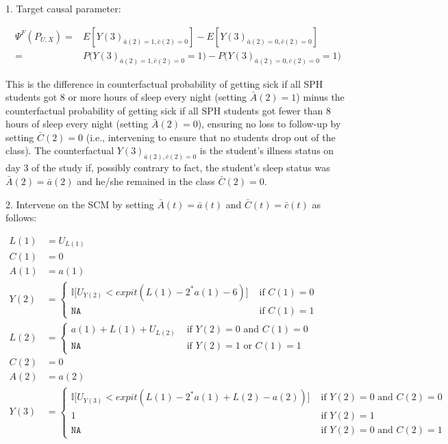 \documentclass[answers]{exam}
\begin{document}
\begin{solution}


1. Target causal parameter:

\begin{align*}
\Psi^F(P_{U,X}) = & E[Y(3)_{\bar{a}(2) = 1, \bar{c}(2) = 0}] - E[Y(3)_{\bar{a}(2) = 0, \bar{c}(2) = 0}] \\
= & P\big(Y(3)_{\bar{a}(2) = 1, \bar{c}(2) = 0} = 1\big) - P\big(Y(3)_{\bar{a}(2) = 0, \bar{c}(2) = 0} = 1\big)
\end{align*}


This is the difference in counterfactual probability of getting sick if all SPH students got 8 or more hours of sleep every night (setting $\bar{A}(2) = 1$) minus the counterfactual probability of getting sick if all SPH students got fewer than 8 hours of sleep every night (setting $\bar{A}(2) = 0$), ensuring no loss to follow-up by setting $\bar{C}(2) = 0$ (i.e., intervening to ensure that no students drop out of the class). The counterfactual $Y(3)_{\bar{a}(2), \bar{c}(2)=0}$ is the student's illness status on day 3 of the study if, possibly contrary to fact, the student's sleep status was $\bar{A}(2)=\bar{a}(2)$ and he/she remained in the class $\bar{C}(2) = 0$.

2. Intervene on the SCM by setting $\bar{A}(t) = \bar{a}(t)$ and $\bar{C}(t) = \bar{c}(t)$ as follows:

\begin{align*}
L(1) &= U_{L(1)}\\
C(1) &= 0 \\
A(1) & = a(1) \\ 
Y(2) &= 
    \begin{cases}
      \mathbb{I} \big[U_{Y(2)} < expit(L(1) - 2^*a(1) - 6) \big] & \text{ if } C(1) = 0\ \\
      \texttt{NA} & \text{ if } C(1) = 1
      \end{cases} \\
L(2) &= 
    \begin{cases}
      a(1) + L(1) + U_{L(2)} & \text{ if } Y(2) = 0 \text{ and } C(1) = 0\ \\
      \texttt{NA} & \text{ if } Y(2) = 1 \text{ or } C(1) = 1
    \end{cases} \\
C(2) &= 0 \\
A(2) &= a(2) \\
Y(3) &=  
    \begin{cases}
      \mathbb{I} \big[ U_{Y(3)} < expit(L(1) - 2^*a(1) + L(2) - a(2)) \big] & \text{ if } Y(2) = 0 \text{ and } C(2) = 0\ \\
      1 & \text{ if } Y(2) = 1\ \\
      \texttt{NA} & \text{ if } Y(2) = 0 \text{ and } C(2) = 1 
    \end{cases} \\
\end{align*}


\end{solution}
\end{document}
